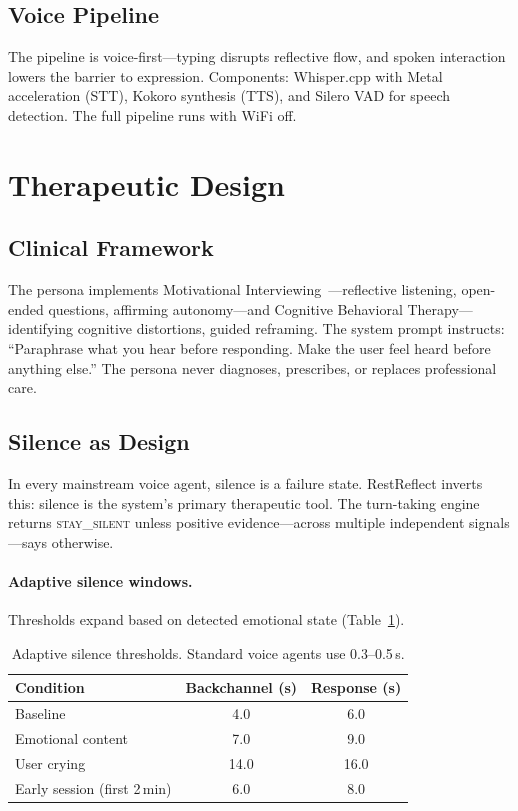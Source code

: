 \documentclass{article}
\begin{document}
\subsection{Voice Pipeline}

The pipeline is voice-first---typing disrupts reflective flow, and spoken interaction lowers the barrier to expression. Components: Whisper.cpp with Metal acceleration (STT), Kokoro synthesis (TTS), and Silero VAD for speech detection. The full pipeline runs with WiFi off.

\section{Therapeutic Design}

\subsection{Clinical Framework}

The persona implements Motivational Interviewing~\citep{miller2013motivational}---reflective listening, open-ended questions, affirming autonomy---and Cognitive Behavioral Therapy---identifying cognitive distortions, guided reframing. The system prompt instructs: ``Paraphrase what you hear before responding. Make the user feel heard before anything else.'' The persona never diagnoses, prescribes, or replaces professional care.

\subsection{Silence as Design}

In every mainstream voice agent, silence is a failure state. RestReflect inverts this: silence is the system's primary therapeutic tool. The turn-taking engine returns \textsc{stay\_silent} unless positive evidence---across multiple independent signals---says otherwise.

\paragraph{Adaptive silence windows.} Thresholds expand based on detected emotional state (Table~\ref{tab:silence}).

\begin{table}[h]
\centering
\small
\caption{Adaptive silence thresholds. Standard voice agents use 0.3--0.5\,s.}
\label{tab:silence}
\begin{tabular}{@{}lcc@{}}
\toprule
Condition & Backchannel (s) & Response (s) \\
\midrule
Baseline & 4.0 & 6.0 \\
Emotional content & 7.0 & 9.0 \\
User crying & 14.0 & 16.0 \\
Early session (first 2\,min) & 6.0 & 8.0 \\
\bottomrule
\end{tabular}
\end{table}
\end{document}
